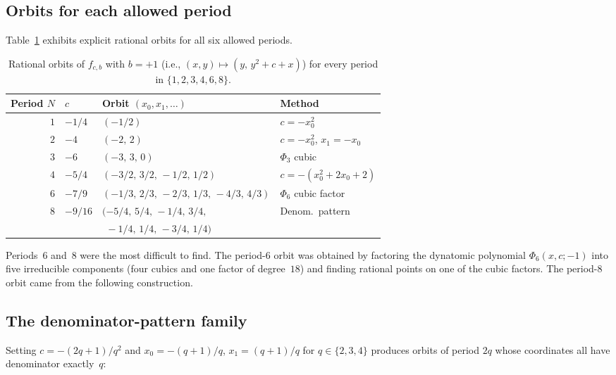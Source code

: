 \documentclass[11pt]{article}
\theoremstyle{definition}
\theoremstyle{remark}
\begin{document}
\subsection{Orbits for each allowed period}

Table~\ref{tab:conj3} exhibits explicit rational orbits for all six allowed periods.

\begin{table}[ht]
  \centering
  \caption{Rational orbits of $f_{c,b}$ with $b = +1$ (i.e., $(x,y) \mapsto (y,\, y^2+c+x)$)
    for every period in $\{1,2,3,4,6,8\}$.}
  \label{tab:conj3}
  \begin{tabular}{@{} rlll @{}}
    \toprule
    Period $N$ & $c$ & Orbit $(x_0, x_1, \ldots)$ & Method \\
    \midrule
    $1$ & $-1/4$ & $(-1/2)$ & $c = -x_0^2$ \\
    $2$ & $-4$   & $(-2,\, 2)$ & $c = -x_0^2$, $x_1 = -x_0$ \\
    $3$ & $-6$   & $(-3,\, 3,\, 0)$ & $\Phi_3$ cubic \\
    $4$ & $-5/4$ & $(-3/2,\, 3/2,\, -1/2,\, 1/2)$ & $c = -(x_0^2 + 2x_0 + 2)$ \\
    $6$ & $-7/9$ & $(-1/3,\, 2/3,\, -2/3,\, 1/3,\, -4/3,\, 4/3)$ & $\Phi_6$ cubic factor \\
    $8$ & $-9/16$ & $(-5/4,\, 5/4,\, -1/4,\, 3/4,$ & Denom.\ pattern \\
        &         & $\phantom{(}-1/4,\, 1/4,\, -3/4,\, 1/4)$ & \\
    \bottomrule
  \end{tabular}
\end{table}

Periods~$6$ and~$8$ were the most difficult to find.  The period-$6$ orbit was
obtained by factoring the dynatomic polynomial $\Phi_6(x,c;-1)$ into five
irreducible components (four cubics and one factor of degree~$18$) and finding
rational points on one of the cubic factors.
The period-$8$ orbit came from the following construction.

\subsection{The denominator-pattern family}\label{sec:denomfamily}

Setting $c = -(2q+1)/q^2$ and $x_0 = -(q+1)/q$, $x_1 = (q+1)/q$ for
$q \in \{2, 3, 4\}$ produces orbits of period $2q$ whose coordinates all
have denominator exactly~$q$:
\end{document}
